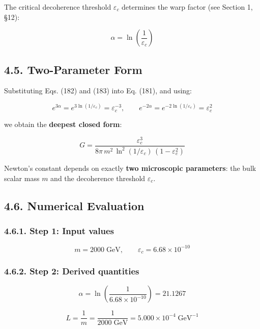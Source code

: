 \documentclass[
  11pt,
]{article}
\begin{document}
The critical decoherence threshold \(\varepsilon_c\) determines the warp
factor (see Section 1, §12):

\[\alpha = \ln\!\left(\frac{1}{\varepsilon_c}\right) \tag{183}\]

\bigskip

\hypertarget{two-parameter-form}{%
\subsection{4.5. Two-Parameter Form}\label{two-parameter-form}}

Substituting Eqs. (182) and (183) into Eq. (181), and using:

\[e^{3\alpha} = e^{3\ln(1/\varepsilon_c)} = \varepsilon_c^{-3}, \qquad e^{-2\alpha} = e^{-2\ln(1/\varepsilon_c)} = \varepsilon_c^{2} \tag{184}\]

we obtain the \textbf{deepest closed form}:

\[\boxed{G = \frac{\varepsilon_c^3}{8\pi\,m^2\,\ln^2(1/\varepsilon_c)\,(1 - \varepsilon_c^2)}} \tag{185}\]

Newton's constant depends on exactly \textbf{two microscopic
parameters}: the bulk scalar mass \(m\) and the decoherence threshold
\(\varepsilon_c\).

\bigskip

\hypertarget{numerical-evaluation}{%
\subsection{4.6. Numerical Evaluation}\label{numerical-evaluation}}

\hypertarget{step-1-input-values}{%
\subsubsection{4.6.1. Step 1: Input values}\label{step-1-input-values}}

\[m = 2000\;\text{GeV}, \qquad \varepsilon_c = 6.68 \times 10^{-10} \tag{186}\]

\hypertarget{step-2-derived-quantities}{%
\subsubsection{4.6.2. Step 2: Derived
quantities}\label{step-2-derived-quantities}}

\[\alpha = \ln\!\left(\frac{1}{6.68 \times 10^{-10}}\right) = 21.1267 \tag{187}\]

\[L = \frac{1}{m} = \frac{1}{2000\;\text{GeV}} = 5.000 \times 10^{-4}\;\text{GeV}^{-1} \tag{188}\]
\end{document}
